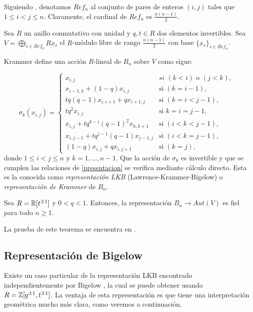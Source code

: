 \documentclass[TFG.tex]{subfiles}
\begin{document}
Siguiendo \cite{Krammer}, denotamos $Ref_n$ al conjunto de pares de enteros $(i,j)$ tales que $1\leq i<j\leq n$. Claramente, el cardinal de $Ref_n$ es $\frac{n(n-1)}{2}$.

Sea $R$ un anillo conmutativo con unidad y $q,t\in R$ dos elementos invertibles. Sea \(V=\displaystyle\bigoplus_{s\in Ref_n}Rx_s\) el $R$-módulo libre de rango $\frac{n(n-1)}{2}$ con base $\{x_s\}_{s\in Ref_n}$. 

Krammer \cite{Krammer} define una acción $R$-lineal de $B_n$ sobre $V$ como sigue:


\begin{equation}\label{LKB}
\sigma_k(x_{i,j})=\begin{cases}
x_{i,j} & \textit{si }(k<i)\text{ o }(j<k),\\
x_{i-1,k}+(1-q)x_{i,j} & \text{si } (k=i-1),\\
tq(q-1)x_{i,i+1}+qx_{i+1,j} & \text{si }(k=i<j-1),\\
tq^2x_{i,j} & \text{si }k=i=j-1,\\
x_{i,j}+tq^{k-i}(q-1)^2x_{k,k+1} & \text{si }(i<k<j-1),\\
x_{i,j-1}+tq^{j-1}(q-1)x_{j-1,j} & \text{si }(i<k=j-1),\\
(1-q)x_{i,j}+qx_{i,j+1} & \text{si }(k=j),
\end{cases}
\end{equation}
donde $1\leq i<j\leq n$ y $k=1,\dots, n-1$. Que la acción de $\sigma_k$ es invertible y que se cumplen las relaciones de \ref{presentacion} se verifica mediante cálculo directo. Esta es la conocida como \emph{representación LKB} (Lawrence-Krammer-Bigelow) o \emph{representación de Krammer} de $B_n$.

\begin{teorema}
Sea $R=\mathbb{R}[t^{\pm 1}]$ y $0<q<1$. Entonces, la representación $B_n\to Aut(V)$ es fiel para todo $n\geq 1$.
\end{teorema}

La prueba de este teorema se encuentra en \cite{Krammer}.


\subsection{Representación de Bigelow}
Existe un caso particular de la representación LKB encontrado independientemente por Bigelow \cite{Bil}, la cual se puede obtener usando $R=\mathbb{Z}[q^{\pm 1},t^{\pm 1}]$. La ventaja de esta representación es que tiene una interpretación geométrica mucho más clara, como veremos a continuación.
\end{document}
